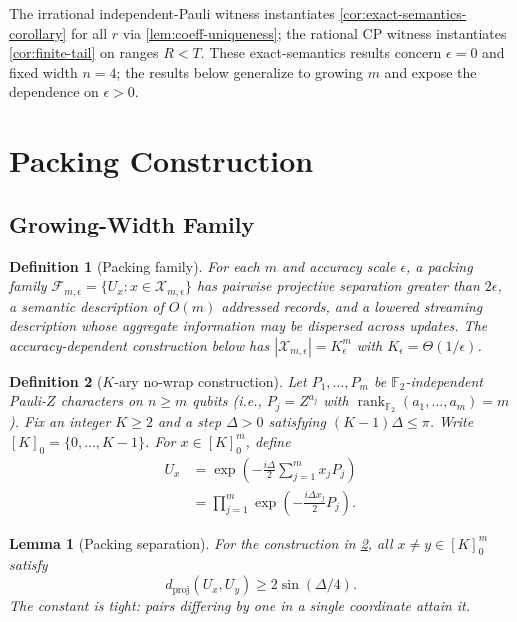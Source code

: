 \documentclass[aps,prx,reprint,floatfix,superscriptaddress]{revtex4-2}
\newtheorem{definition}{Definition}
\newtheorem{lemma}{Lemma}
\newcommand{\Ftwo}{\mathbb{F}_2}
\begin{document}
The irrational independent-Pauli witness instantiates
\cref{cor:exact-semantics-corollary} for all $r$ via
\cref{lem:coeff-uniqueness}; the rational CP witness instantiates
\cref{cor:finite-tail} on ranges $R < T$. These exact-semantics results
concern $\epsilon = 0$ and fixed width $n = 4$; the results below
generalize to growing $m$ and expose the dependence on $\epsilon>0$.


\section{Packing Construction}
\label{sec:packing}

\subsection{Growing-Width Family}

\begin{definition}[Packing family]
\label{def:packing-family}
For each $m$ and accuracy scale $\epsilon$, a packing family
$\mathcal F_{m,\epsilon}=\{U_x:x\in\mathcal X_{m,\epsilon}\}$ has
pairwise projective separation greater than $2\epsilon$, a semantic
description of $O(m)$ addressed records, and a lowered streaming
description whose aggregate information may be dispersed across updates.
The accuracy-dependent construction below has
$|\mathcal X_{m,\epsilon}|=K_\epsilon^m$ with
$K_\epsilon=\Theta(1/\epsilon)$.
\end{definition}

\begin{definition}[$K$-ary no-wrap construction]
\label{def:packing-construction}
Let $P_1,\ldots,P_m$ be $\Ftwo$-independent Pauli-$Z$ characters on $n \geq m$
qubits (i.e., $P_j = Z^{a_j}$ with $\operatorname{rank}_{\Ftwo}(a_1,\ldots,a_m)=m$).
Fix an integer $K\geq2$ and a step $\Delta>0$ satisfying
$(K-1)\Delta\leq\pi$.  Write $[K]_0=\{0,\ldots,K-1\}$.  For
$x\in[K]_0^m$, define
\begin{equation}\label{eq:Ux-def}
  \begin{aligned}
  U_x &= \exp\!\left(-\frac{i\Delta}{2}\sum_{j=1}^{m} x_j P_j\right) \\
      &= \prod_{j=1}^{m} \exp\!\left(-\frac{i\Delta x_j}{2} P_j\right).
\end{aligned}
\end{equation}
\end{definition}

\begin{lemma}[Packing separation]
\label{lem:packing-separation}
For the construction in \cref{def:packing-construction},
all $x\neq y\in[K]_0^m$ satisfy
\begin{equation}\label{eq:Kary-separation}
 d_{\mathrm{proj}}(U_x,U_y)\geq2\sin(\Delta/4).
\end{equation}
The constant is tight: pairs differing by one in a single coordinate
attain it.
\end{lemma}
\end{document}
